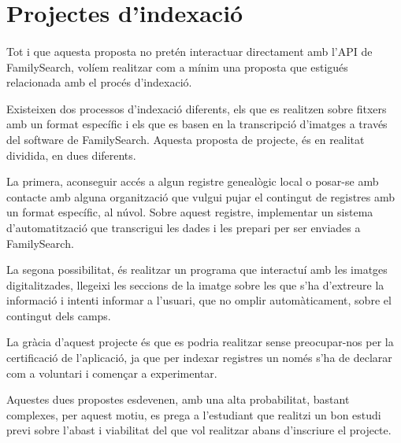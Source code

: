 \section{Projectes d'indexació}

    \paragraph{}
    Tot i que aquesta proposta no pretén interactuar directament amb l'API de FamilySearch, volíem realitzar com a mínim una proposta que estigués relacionada amb el procés d'indexació.

    Existeixen dos processos d'indexació diferents, els que es realitzen sobre fitxers amb un format específic i els que es basen en la transcripció d'imatges a través del software de FamilySearch. Aquesta proposta de projecte, és en realitat dividida, en dues diferents.

    La primera, aconseguir accés a algun registre genealògic local o posar-se amb contacte amb alguna organització que vulgui pujar el contingut de registres amb un format específic, al núvol. Sobre aquest registre, implementar un sistema d'automatització que transcrigui les dades i les prepari per ser enviades a FamilySearch.

    La segona possibilitat, és realitzar un programa que interactuí amb les imatges digitalitzades, llegeixi les seccions de la imatge sobre les que s'ha d'extreure la informació i intenti informar a l'usuari, que no omplir automàticament, sobre el contingut dels camps.

    La gràcia d'aquest projecte és que es podria realitzar sense preocupar-nos per la certificació de l'aplicació, ja que per indexar registres un només s'ha de declarar com a voluntari i començar a experimentar.

    Aquestes dues propostes esdevenen, amb una alta probabilitat, bastant complexes, per aquest motiu, es prega a l'estudiant que realitzi un bon estudi previ sobre l'abast i viabilitat del que vol realitzar abans d'inscriure el projecte.

